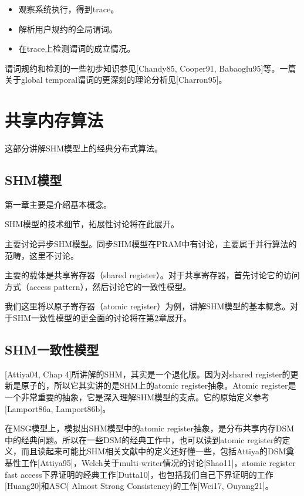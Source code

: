 \documentclass[UTF8]{ctexrep}
\begin{document}
\begin{itemize}
    \item 观察系统执行，得到trace。
    \item 解析用户规约的全局谓词。
    \item 在trace上检测谓词的成立情况。
\end{itemize}

谓词规约和检测的一些初步知识参见[Chandy85, Cooper91, Babaoglu95]等。一篇关于global temporal谓词的更深刻的理论分析见[Charron95]。


\part{共享内存算法}

这部分讲解SHM模型上的经典分布式算法。

\chapter{SHM模型} \label{Chap_SHM}

第一章主要是介绍基本概念。

SHM模型的技术细节，拓展性讨论将在此展开。

主要讨论异步SHM模型。同步SHM模型在PRAM中有讨论，主要属于并行算法的范畴，这里不讨论。

主要的载体是共享寄存器（shared register）。对于共享寄存器，首先讨论它的访问方式（access pattern），然后讨论它的一致性模型。

我们这里将以原子寄存器（atomic register）为例，讲解SHM模型的基本概念。对于SHM一致性模型的更全面的讨论将在第\ref{Chap_SHM-Consis}章展开。

\chapter{SHM一致性模型} \label{Chap_SHM-Consis}

[Attiya04, Chap 4]所讲解的SHM，其实是一个退化版。因为对shared register的更新是原子的，所以它其实讲的是SHM上的atomic register抽象。Atomic register是一个非常重要的抽象，它是深入理解SHM模型的支点。它的原始定义参考[Lamport86a, Lamport86b]。

在MSG模型上，模拟出SHM模型中的atomic register抽象，是分布共享内存DSM中的经典问题。所以在一些DSM的经典工作中，也可以读到atomic register的定义，而且读起来可能比SHM相关文献中的定义还好懂一些，包括Attiya的DSM奠基性工作[Attiya95]，Welch关于multi-writer情况的讨论[Shao11]，atomic register fast access下界证明的经典工作[Dutta10]，也包括我们自己下界证明的工作[Huang20]和ASC( Almost Strong Consistency)的工作[Wei17, Ouyang21]。
\end{document}
